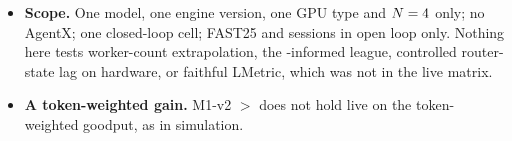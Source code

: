 \begin{itemize}
    session context (no mismatch in 42 runs), and the code path to the policy exists, but no run shows
    \lc{}'s session feature receiving a session live. Only the sessions cell could exercise it, and that
    cell cannot inform M1-v2 minus .
  \item \textbf{Scope.} One model, one engine version, one GPU type and $N = 4$ only; no AgentX; one
    closed-loop cell; FAST25 and sessions in open loop only. Nothing here tests worker-count
    extrapolation, the \ais{}-informed league, controlled router-state lag on hardware, or faithful LMetric,
    which was not in the live matrix.
  \item \textbf{A token-weighted gain.} M1-v2 $>$  does not hold live on the
    token-weighted goodput, as in simulation.
\end{itemize}

